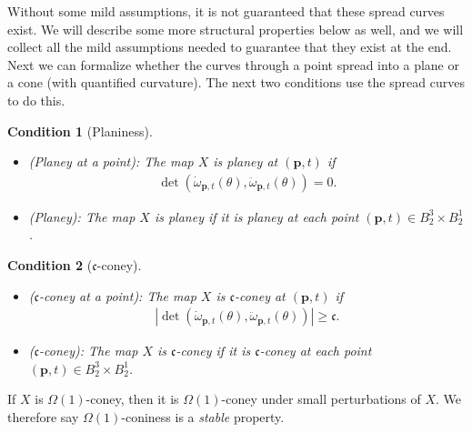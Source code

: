 \documentclass[12pt]{amsart}
\numberwithin{equation}{section}
\newtheorem{condition}{Condition}
\newcommand{\1}{\mathbbm{1}}
\newcommand{\p}{\mathbf p}
\begin{document}
Without some mild assumptions, it is not guaranteed that these spread curves exist. We will describe some more structural properties below as well, and we will collect all the mild assumptions needed to guarantee that they exist at the end.
Next we can formalize whether the curves through a point spread into a plane or a cone (with quantified curvature). The next two conditions use the spread curves to do this. 

\begin{condition}[Planiness]\label{cond: planey}\hfill
    \begin{itemize}
        \item (Planey at a point): The map $X$ is \emph{planey at $(\p,t)$} if 
        \begin{align}
            \det(\dot \omega_{\p,t}(\theta), \ddot \omega_{\p,t}(\theta)) = 0.
        \end{align}
        \item (Planey): The map $X$ is \emph{planey} if it is planey at each point $(\p,t) \in B_2^3 \times B_2^1$. 
    \end{itemize}
\end{condition}

\begin{condition}[$\mathfrak c$-coney] \label{cond: coney}\hfill
    \begin{itemize}
        \item ($\mathfrak c$-coney at a point): The map $X$ is \emph{$\mathfrak c$-coney at $(\p,t)$} if 
        \begin{align}
            |\det(\dot \omega_{\p,t}(\theta), \ddot \omega_{\p,t}(\theta))| \geq \mathfrak c. 
        \end{align}
        \item ($\mathfrak c$-coney): The map $X$ is \emph{$\mathfrak c$-coney} if it is $\mathfrak c$-coney at each point $(\p,t) \in B_2^3 \times B_2^1$. 
    \end{itemize}
\end{condition}
If $X$ is $\Omega(1)$-coney, then it is $\Omega(1)$-coney under small perturbations of $X$. We therefore say $\Omega(1)$-coniness is a \emph{stable} property. 
\end{document}
